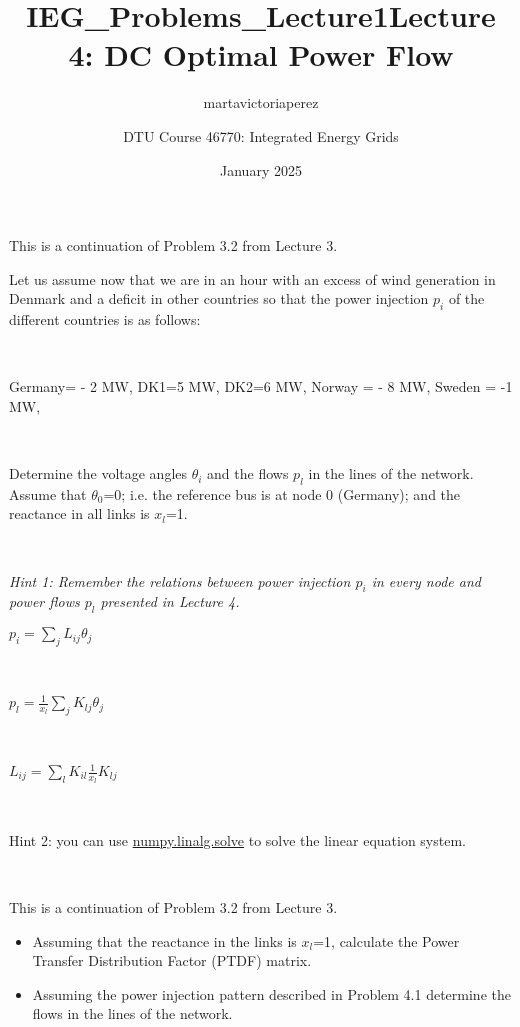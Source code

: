 \documentclass[10pt]{article}
\title{IEG_Problems_Lecture1}
\author{martavictoriaperez }
\date{January 2025}
\newenvironment{problem}[2][Problem]{\begin{trivlist}
\item[\hskip \labelsep {\bfseries #1}\hskip \labelsep {\bfseries #2.}]}{\end{trivlist}}
\begin{document}
 
\title{\textbf{Lecture 4: DC Optimal Power Flow}}
\author{
DTU Course 46770: Integrated Energy Grids }
\maketitle
\begin{problem}{4.1}

This is a continuation of Problem 3.2 from Lecture 3.

Let us assume now that we are in an hour with an excess of wind generation in Denmark and a deficit in other countries so that the power injection $p_i$ of the different countries is as follows:

\

Germany= - 2 MW, DK1=5 MW, DK2=6 MW, Norway = - 8 MW, Sweden = -1 MW, 

\

Determine the voltage angles $\theta_i$  and the flows $p_l$ in the lines of the network. Assume that $\theta_0$=0; i.e. the reference bus is at node 0 (Germany); and the reactance in all links is $x_l$=1.

\

\textit{Hint 1: Remember the relations between power injection $p_i$ in every node and power flows $p_l$ presented in Lecture 4.}

$p_i=\sum_j {L_{ij} \theta_j } $

\

$p_l=\frac{1}{x_l}  \sum_j{K_{lj} \theta_j}$       

\

$L_{ij}=\sum_l{K_{il} \frac{1}{x_l} K_{lj}}$

\

Hint 2: you can use \href{https://numpy.org/doc/2.1/reference/generated/numpy.linalg.solve.html}{numpy.linalg.solve} to solve the linear equation system. 



\end{problem}

\

\begin{problem}{4.2}

This is a continuation of Problem 3.2 from Lecture 3.

\begin{itemize}

\item[a)] Assuming that the reactance in the links is $x_l$=1, calculate the Power Transfer Distribution Factor (PTDF) matrix.

\item[b)] Assuming the power injection pattern described in Problem 4.1 determine the flows in the lines of the network. 

\end{itemize}

\end{problem}
\end{document}

